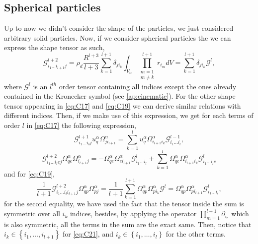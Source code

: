 {\subsection{Spherical particles}
Up to now we didn't consider the shape of the particles, we just considered arbitrary solid particles. 
Now, if we consider spherical particles the we can express the shape tensor as such,
\begin{equation}
    \mathcal{G}_{i_1\ldots i_{l+1}j}^{l+2}
    =\rho_d \frac{R^{l+3}}{l+3}\sum_{k=1}^{l+1} \delta_{j i_k}
    \int_{V_\alpha}  \prod^{l+1}_{\substack{m=1\\ m\neq k}} r_{i_m} dV
    = \sum_{k=1}^{l+1} \delta_{j i_k} \mathcal{G}^l,
\end{equation}
where $\mathcal{G}^l$ is an $l^{th}$ order tensor containing all indices except the ones already contained in the Kronecker symbol (see \ref{ap:cinematic}).
For the other shape tensor appearing in \ref{eq:C17} and \ref{eq:C19} we can derive similar relations with different indices.
Then, if we make use of this expression, we get for each terms of order $l$ in \ref{eq:C17} the following expression,
\begin{equation}
    \mathcal{G}_{i_1\ldots i_l j}^{l+1} u^\alpha_q\Omega_{ji_{l+1}}^\alpha
    = \sum_{k=1}^{l}
    u^\alpha_q\Omega_{i_{l+1}i_k}^\alpha \mathcal{G}^{l-1}_{i_1\ldots i_l},
    \label{eq:C23}
\end{equation}
\begin{equation}
    \mathcal{G}_{i_1\ldots i_l ej}^{l+2}\Omega_{qe}^\alpha \Omega_{i_{l+1}j}^\alpha =
    -\Omega_{qe}^\alpha \Omega_{ei_{l+1}}^\alpha \mathcal{G}^l_{i_1 \ldots i_l}
    +\sum_{k=1}^{l}
    \Omega_{qe}^\alpha \Omega_{i_{l+1}i_k}^\alpha \mathcal{G}^l_{i_1\ldots i_le}
    \label{eq:C24}
\end{equation}
and for \ref{eq:C19},
\begin{equation}
    \frac{1}{l+1}\mathcal{G}_{i_1\ldots i_l i_{l+1}j}^{l+2}\Omega_{qp}^\alpha \Omega_{pj}^\alpha
    =
    \frac{1}{l+1}
    \sum_{k=1}^{l+1}
    \Omega_{qp}^\alpha \Omega_{p i_k}^\alpha \mathcal{G}^l
    =
    \Omega_{qp}^\alpha \Omega_{p i_{l+1}}^\alpha \mathcal{G}^l_{i_1 \ldots i_l},
    \label{eq:C21}
\end{equation}
for the second equality, we have used the fact that the tensor inside the sum is symmetric over all $i_k$ indices, besides, by applying the operator $\prod_{m=1}^{l+1}\partial_{i_e}$ which is also symmetric, all the terms in the sum are the exact same.  
Then, notice that $i_k \in \left\{ i_1, \dots, i_{l+1}\right\}$ for \ref{eq:C21},  and $i_k \in \left\{ i_1, \dots, i_{l}\right\}$ for the other terms.
}
